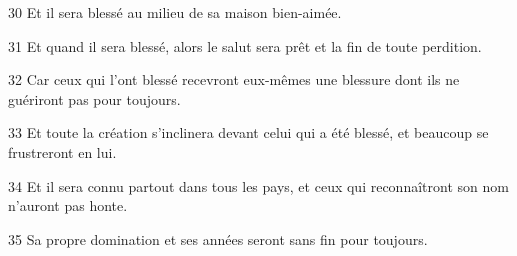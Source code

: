 \par 30 Et il sera blessé au milieu de sa maison bien-aimée.

\par 31 Et quand il sera blessé, alors le salut sera prêt et la fin de toute perdition.

\par 32 Car ceux qui l'ont blessé recevront eux-mêmes une blessure dont ils ne guériront pas pour toujours.

\par 33 Et toute la création s'inclinera devant celui qui a été blessé, et beaucoup se frustreront en lui.

\par 34 Et il sera connu partout dans tous les pays, et ceux qui reconnaîtront son nom n'auront pas honte.

\par 35 Sa propre domination et ses années seront sans fin pour toujours.

